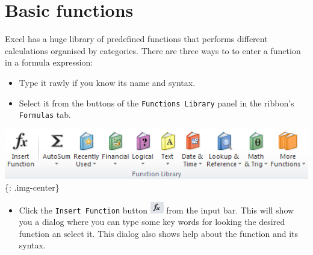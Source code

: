 \chapter{Basic functions}
\label{basicfunctions}

Excel has a huge library of predefined functions that performs different calculations organised by categories. There are three ways to to enter a function in a formula expression:

\begin{itemize}
\item Type it rawly if you know its name and syntax.

\item Select it from the buttons of the \texttt{Functions Library} panel in the ribbon's \texttt{Formulas} tab.

\end{itemize}

\includegraphics[keepaspectratio,width=\textwidth,height=0.75\textheight]{img/panel_formulas.png}
\{: .img-center\}

\begin{itemize}
\item Click the \texttt{Insert Function} button \includegraphics[keepaspectratio,width=\textwidth,height=0.75\textheight]{img/button_insert_function.png}
 from the input bar. This will show you a dialog where you can type some key words for looking the desired function an select it. This dialog also shows help about the function and its syntax.

\end{itemize}

